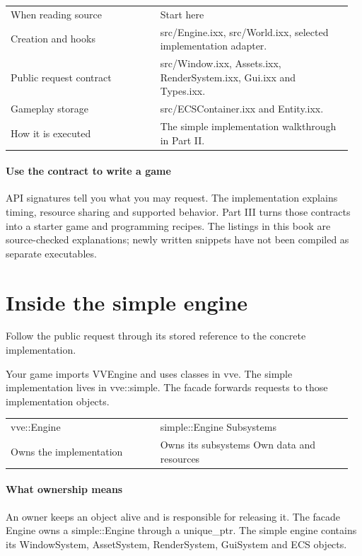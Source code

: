 \documentclass[11pt,a4paper]{article}
\begin{document}
{\small
\begin{longtable}{@{}p{0.42\linewidth}p{0.54\linewidth}@{}}
When reading source & Start here \\
Creation and hooks & src/Engine.ixx, src/World.ixx, selected implementation adapter. \\
Public request contract & src/Window.ixx, Assets.ixx, RenderSystem.ixx, Gui.ixx and Types.ixx. \\
Gameplay storage & src/ECSContainer.ixx and Entity.ixx. \\
How it is executed & The simple implementation walkthrough in Part II. \\
\end{longtable}
}

\subsection*{Use the contract to write a game}
API signatures tell you what you may request. The implementation explains timing, resource sharing and supported behavior. Part III turns those contracts into a starter game and programming recipes. The listings in this book are source-checked explanations; newly written snippets have not been compiled as separate executables.

\clearpage\part{Inside the simple engine}
\label{core-24}
Follow the public request through its stored reference to the concrete implementation.

Your game imports VVEngine and uses classes in vve. The simple implementation lives in vve::simple. The facade forwards requests to those implementation objects.

{\small
\begin{longtable}{@{}p{0.42\linewidth}p{0.54\linewidth}@{}}
vve::Engine & simple::Engine                      Subsystems \\
Owns the implementation & Owns its subsystems              Own data and resources \\
\end{longtable}
}

\subsection*{What ownership means}
An owner keeps an object alive and is responsible for releasing it. The facade Engine owns a simple::Engine through a unique\_ptr. The simple engine contains its WindowSystem, AssetSystem, RenderSystem, GuiSystem and ECS objects.
\end{document}
